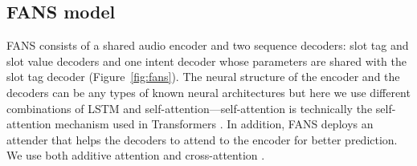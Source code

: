 \documentclass[a4paper]{article}
\begin{document}
 \subsection{FANS model} 
FANS consists of a shared audio encoder and two sequence decoders: slot tag and slot value decoders and one intent decoder whose parameters are shared with the slot tag decoder (Figure~\ref{fig:fans}). The neural structure of the encoder and the decoders can be any types of known neural architectures but here we use  different combinations of LSTM and self-attention---self-attention is technically  the self-attention mechanism used in Transformers \cite{vaswani2017attention} .  In addition, FANS deploys an attender that helps the decoders to attend to the encoder for better prediction.  We use both  additive attention \cite{bahdanau2014neural} and cross-attention  \cite{vaswani2017attention}.
\end{document}
